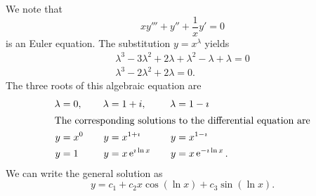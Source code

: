 {%
\begin{Solution}
  \label{solution xy+y+1xy}
  We note that
  \[ 
  x y''' + y'' + \frac{1}{x} y' = 0 
  \]
  is an Euler equation.  The substitution $y = x^\lambda$ yields
  \begin{gather*}
    \lambda^3 - 3 \lambda^2 + 2 \lambda + \lambda^2 - \lambda + \lambda = 0 \\
    \lambda^3 - 2 \lambda^2 + 2 \lambda = 0.
  \end{gather*}
  The three roots of this algebraic equation are
  \begin{alignat*}{3}
    \lambda &= 0,   &\quad   \lambda &= 1 + i,       &\quad  \lambda &= 1 - \imath \\
    \intertext{The corresponding solutions to the differential equation are}
    y &= x^0        &\quad  y &= x^{1 + \imath}    &\quad  y &= x^{1 - \imath} \\
    y &= 1          &\quad  y &= x \mathop{\mathrm{e}}\nolimits^{\imath \ln x}      &\quad  y &= x \mathop{\mathrm{e}}\nolimits^{-\imath \ln x}.
  \end{alignat*}
  We can write the general solution as
  \[ 
  \boxed{ 
    y = c_1 + c_2 x \cos(\ln x) + c_3 \sin(\ln x). 
    } 
  \]
\end{Solution}






}
